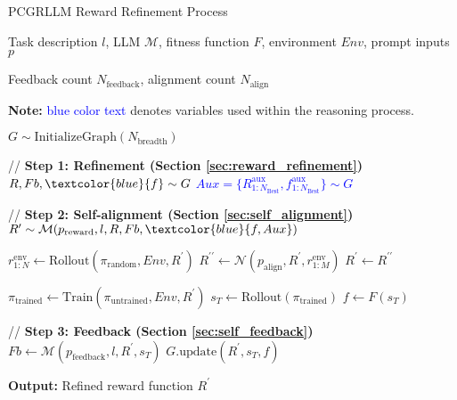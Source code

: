 \begin{algorithm}[!h]
\caption{PCGRLLM Reward Refinement Process}
\label{alg:pcgrllm}
\begin{algorithmic}[1]
\Require Task description $l$, LLM $\mathcal{M}$, fitness function $F$, environment $Env$, prompt inputs $p$

\Require Feedback count $N_{\text{feedback}}$, alignment count $N_{\text{align}}$

\State \textbf{Note:} \textcolor{blue}{blue color text} denotes variables used within the reasoning process.

\State $G \sim \text{InitializeGraph}(N_{\text{breadth}})$

    \State // \textbf{Step 1: Refinement (Section \ref{sec:reward_refinement})}
    \State $R, {Fb}, \textcolor{blue}{f} \sim G$ 
    \textcolor{blue}{
    \State $Aux = \{R^{\text{aux}}_{1:N_{\text{Best}}}, f^{\text{aux}}_{1:N_{\text{Best}}}\} \sim G$ 
    }

    \State // \textbf{Step 2: Self-alignment (Section \ref{sec:self_alignment})}
    \State $R^{\prime} \sim \mathcal{M}(p_{\text{reward}}, l, R, {Fb}, \textcolor{blue}{f, Aux})$

        \State $r^{\text{env}}_{1:N} \gets \text{Rollout}(\pi_{\text{random}},Env, R^{\prime})$
        \State $R^{\prime\prime} \gets \mathcal{N}(p_{\text{align}}, R^{\prime}, r^{\text{env}}_{1:M})$
        \State $R^{\prime} \gets R^{\prime\prime}$
    \EndFor

    \State $\pi_{\text{trained}} \gets \text{Train}(\pi_{\text{untrained}}, Env, R^{\prime})$
    \State $s_T \gets \text{Rollout}(\pi_{\text{trained}})$ 
    \State $f \gets F(s_{T})$ 

    \State // \textbf{Step 3: Feedback (Section \ref{sec:self_feedback})}
    \State ${Fb} \gets \mathcal{M}(p_{\text{feedback}}, l, R^{\prime}, s_T)$
    \State $G.\text{update}(R^{\prime}, s_T, f)$
\EndFor

\State \textbf{Output:} Refined reward function $R^{\prime}$
\end{algorithmic}
\end{algorithm}

